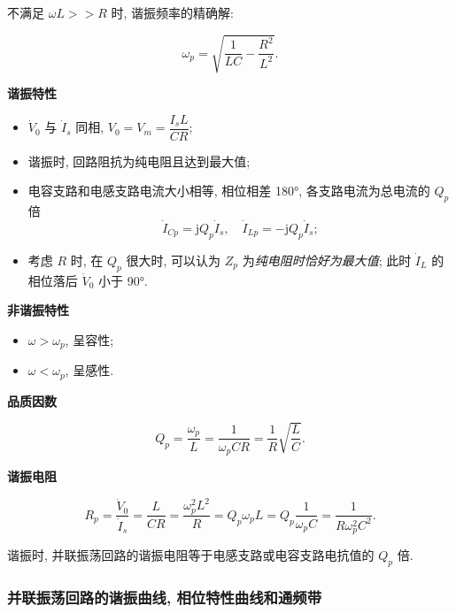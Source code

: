 \documentclass{notes}
\begin{document}
不满足 $\omega L>>R$ 时, 谐振频率的精确解:

\begin{equation}
    \omega_p=\sqrt{\frac{1}{LC}-\frac{R^2}{L^2}}.
\end{equation}

\textbf{谐振特性}

\begin{itemize}
    \item $\dot{V}_0$ 与 $\dot{I}_s$ 同相, $V_0=V_m=\dfrac{I_sL}{CR}$;
    \item 谐振时, 回路阻抗为纯电阻且达到最大值;
    \item 电容支路和电感支路电流大小相等, 相位相差 180°, 各支路电流为总电流的 $Q_p$ 倍
          \begin{equation}
              \dot{I}_{Cp}=\mathrm{j}Q_p\dot{I}_s,\quad\dot{I}_{Lp}=-\mathrm{j}Q_p\dot{I}_s;
          \end{equation}
    \item 考虑 $R$ 时, 在 $Q_p$ 很大时, 可以认为 $Z_p$ 为\textit{纯电阻时恰好为最大值}; 此时 $\dot{I}_L$ 的相位落后 $\dot{V}_0$ 小于 90°.
\end{itemize}

\textbf{非谐振特性}

\begin{itemize}
    \item $\omega>\omega_p$, 呈容性;
    \item $\omega<\omega_p$, 呈感性.
\end{itemize}

\textbf{品质因数}

\begin{equation}
    Q_p=\frac{\omega_p}{L}=\frac{1}{\omega_pCR}=\frac{1}{R}\sqrt{\frac{L}{C}}.
\end{equation}

\textbf{谐振电阻}

\begin{equation}
    R_p=\frac{\dot{V}_0}{\dot{I}_s}=\frac{L}{CR}=\frac{\omega_p^2L^2}{R}=Q_p\omega_pL=Q_p\frac{1}{\omega_pC}=\frac{1}{R\omega_p^2C^2}.
\end{equation}

谐振时, 并联振荡回路的谐振电阻等于电感支路或电容支路电抗值的 $Q_p$ 倍.

\subsubsection{并联振荡回路的谐振曲线, 相位特性曲线和通频带}
\end{document}
